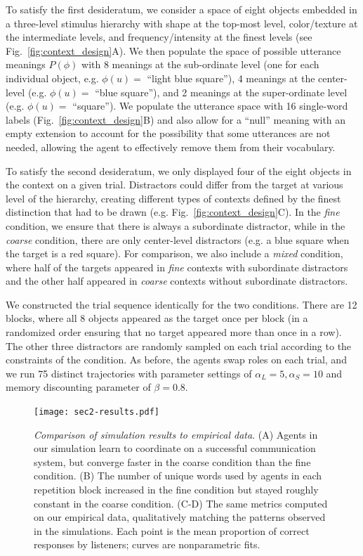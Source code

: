 To satisfy the first desideratum, we consider a space of eight objects embedded in a three-level stimulus hierarchy with shape at the top-most level, color/texture at the intermediate levels, and frequency/intensity at the finest levels (see Fig.~\ref{fig:context_design}A). 
We then populate the space of possible utterance meanings $P(\phi)$ with 8 meanings at the sub-ordinate level (one for each individual object, e.g. $\phi(u) =$ ``light blue square''), 4 meanings at the center-level (e.g. $\phi(u) =$ ``blue square''), and 2 meanings at the super-ordinate level (e.g. $\phi(u) =$ ``square'').
We populate the utterance space with 16 single-word labels (Fig.~\ref{fig:context_design}B) and also allow for a ``null'' meaning with an empty extension to account for the possibility that some utterances are not needed, allowing the agent to effectively remove them from their vocabulary.

To satisfy the second desideratum, we only displayed four of the eight objects in the context on a given trial.
Distractors could differ from the target at various level of the hierarchy, creating different types of contexts defined by the finest distinction that had to be drawn (e.g. Fig.~\ref{fig:context_design}C). 
In the \emph{fine} condition, we ensure that there is always a subordinate distractor, while in the \emph{coarse} condition, there are only center-level distractors (e.g. a blue square when the target is a red square).
For comparison, we also include a \emph{mixed} condition, where half of the targets appeared in \emph{fine} contexts with subordinate distractors and the other half appeared in \emph{coarse} contexts without subordinate distractors.

We constructed the trial sequence identically for the two conditions. 
There are 12 blocks, where all 8 objects appeared as the target once per block (in a randomized order ensuring that no target appeared more than once in a row).
The other three distractors are randomly sampled on each trial according to the constraints of the condition.
As before, the agents swap roles on each trial, and we run 75 distinct trajectories with parameter settings of $\alpha_L=5, \alpha_S=10$ and memory discounting parameter of $\beta = 0.8$.%


\begin{figure}[t]
\begin{center}
\texttt{[image: sec2-results.pdf]}
\vspace{1ex}
\caption{\emph{Comparison of simulation results to empirical data}. (A) Agents in our simulation learn to coordinate on a successful communication system, but converge faster in the coarse condition than the fine condition.  (B) The number of unique words used by agents in each repetition block increased in the fine condition but stayed roughly constant in the coarse condition. (C-D) The same metrics computed on our empirical data, qualitatively matching the patterns observed in the simulations. Each point is the mean proportion of correct responses by listeners; curves are nonparametric fits.}
\label{fig:sec2Results}
\end{center}
\end{figure}

